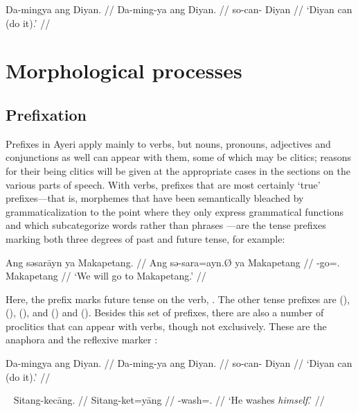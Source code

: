 \ex\begingl
	\gla Da-mingya ang Diyan. //
	\glb Da-ming-ya ang Diyan. //
	\glc so-can-\TsgM{} \Aarg{} Diyan //
	\glft `Diyan can (do it).' //
\endgl\xe

\section{Morphological processes}

\subsection{Prefixation}

Prefixes in Ayeri apply mainly to verbs, but nouns, pronouns, adjectives and
conjunctions as well can appear with them, some of which may be clitics;
reasons for their being clitics will be given at the appropriate cases in the
sections on the various parts of speech. With verbs, prefixes that are most
certainly `true' prefixes---that is, morphemes that have been semantically
bleached by grammaticalization to the point where they only express grammatical
functions \citep[157ff.]{lehmann2015} and which subcategorize words rather than
phrases \citep[117]{klavans1985}---are the tense prefixes marking both three
degrees of past and future tense, for example:

\ex\begingl
	\gla Ang səsarāyn ya Makapetang. //
	\glb Ang sə-sara=ayn.Ø ya Makapetang //
	\glc \AgtT{} \Fut{}-go=\Fpl{}.\Top{} \Loc{} Makapetang //
	\glft `We will go to Makapetang.' //
\endgl\xe

Here, the prefix  marks future tense on the verb, 
. The other tense prefixes are  
(\NPst{}),  (\Pst{}),  (\RPst{}), and 
 (\NFut{}) and  (\RFut{}). Besides this set of 
prefixes, there are also a number of proclitics that can appear with verbs, 
though not exclusively. These are the anaphora  
and the reflexive marker :
 
\ex\begingl
	\gla Da-mingya ang Diyan. //
	\glb Da-ming-ya ang Diyan. //
	\glc so-can-\TsgM{} \Aarg{} Diyan //
	\glft `Diyan can (do it).' //
\endgl
% 
\xe

\ex~\begingl
	\gla Sitang-kecāng. //
	\glb Sitang-ket=yāng //
	\glc \Refl{}-wash=\TsgM{}.\Aarg{} //
	\glft `He washes \emph{himself}.' //
\endgl\xe

